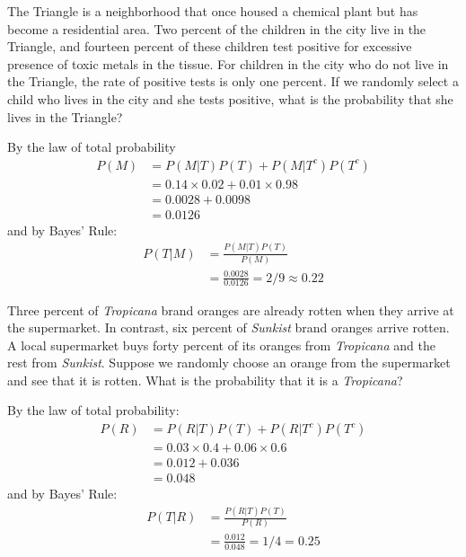 \documentclass[addpoints,12pt]{exam}
\begin{document}
\begin{questions}
	

\question The Triangle is a neighborhood that once housed a chemical plant but has become a residential area. Two percent of the children in the city live in the Triangle, and fourteen percent of these children test positive for excessive presence of toxic metals in the tissue. For children in the city who do not live in the Triangle, the rate of positive tests is only one percent. If we randomly select a child who lives in the city and she tests positive, what is the probability that she lives in the Triangle?
		\begin{solution}
		By the law of total probability
		\begin{align*}
		P(M) &= P(M|T)P(T) + P(M|T^c)P(T^c)\\
			&= 0.14 \times 0.02 +  0.01 \times 0.98\\
			&= 0.0028 + 0.0098 \\
			&= 0.0126
		\end{align*}
		and by Bayes' Rule:
				\begin{align*}
				P(T|M) &= \frac{P(M|T)P(T)}{P(M)}\\
					&= \frac{0.0028}{0.0126} = 2/9 \approx 0.22
				\end{align*}
			\end{solution}


\question Three percent of \emph{Tropicana} brand oranges are already rotten when they arrive at the supermarket. In contrast, six percent of \emph{Sunkist} brand oranges arrive rotten. A local supermarket buys forty percent of its oranges from \emph{Tropicana} and the rest from \emph{Sunkist}. 
		Suppose we randomly choose an orange from the supermarket and see that it is rotten. What is the probability that it is a \emph{Tropicana}?
		\begin{solution}
			By the law of total probability:
				\begin{align*}
				P(R) &= P(R|T)P(T) + P(R|T^c)P(T^c)\\
					&= 0.03 \times 0.4 + 0.06 \times 0.6\\
					&= 0.012 + 0.036 \\
					&= 0.048
				\end{align*}
		 and by Bayes' Rule:
			\begin{align*}
			P(T|R) &= \frac{P(R|T)P(T)}{P(R)}\\
					&= \frac{0.012}{0.048} = 1/4 = 0.25
			\end{align*}
		\end{solution}


\end{questions}
\end{document}
